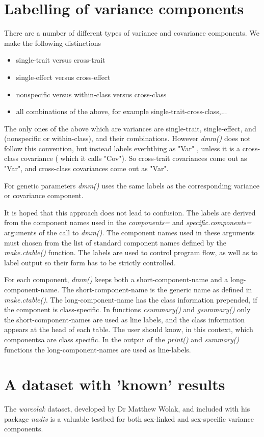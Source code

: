 \documentclass[titlepage]{article}  %
\begin{document}
\section{Labelling of variance components}
	There are a number  of different types of variance and covariance components. We make the following distinctions
\begin{itemize}
\item single-trait versus cross-trait
\item single-effect versus cross-effect
\item nonspecific versus within-class versus cross-class
\item all combinations of the above, for example single-trait-cross-class,...
\end{itemize}
The only ones of the above which are variances are single-trait, single-effect, and (nonspecific or within-class), and their combinations. However {\em dmm()} does not follow this convention, but instead labels everhthing as "Var" , unless it is a cross-class covariance ( which it calls "Cov"). So cross-trait covariances come out as "Var", and cross-class covariances come out as "Var".

For genetic parameters {\em dmm()} uses the same labels as the corresponding variance or covariance component. 

It is hoped that this approach does not lead to confusion. The labels are derived from the component names used in the {\em components=} and {\em specific.components=} arguments of the call to {\em dmm()}. The component names used in these arguments must chosen from the list of standard component names defined by the {\em make.ctable()} function. The labels are used to control program flow, as well as to label output so their form has to be strictly controlled.

For each component, {\em dmm()} keeps both a short-component-name and a long-component-name.
The short-component-name is the generic name as defined in {\em make.ctable()}. The long-component-name has the class information prepended, if the component is class-specific. In functions {\em csummary()} and {\em gsummary()} only the short-component-names are used as line labels, and the class information appears at the head of each table. The user should know, in this context, which componentsa are class specific. In the output of the {\em print()} and {\em summary()} functions the long-component-names are used as line-labels.


\section{A dataset with 'known' results}
The {\em warcolak} dataset, developed by Dr Matthew Wolak, and included with his package {\em nadiv} is a valuable testbed for both sex-linked and sex-specific variance components.
 
\end{document}

